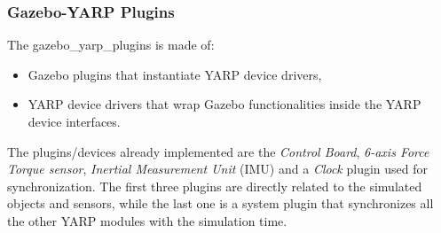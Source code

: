 \subsubsection{Gazebo-YARP Plugins}
The gazebo\_yarp\_plugins is made of:
\begin{itemize}
    \item Gazebo plugins that instantiate YARP device drivers,
    \item YARP device drivers that wrap Gazebo functionalities inside the YARP device interfaces.
\end{itemize}
The plugins/devices already implemented are the \emph{Control Board}, \emph{6-axis Force Torque sensor}, \emph{Inertial Measurement Unit} (IMU) and a \emph{Clock} plugin used for synchronization.
The first three plugins are directly related to the simulated objects and sensors, while the last one is a system plugin that synchronizes all the other YARP modules with the simulation time. 

